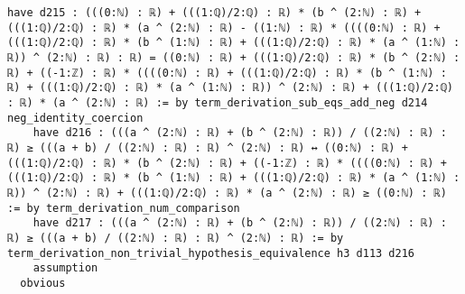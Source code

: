 \documentclass{article}
\begin{document}
\begin{tcolorbox}[colback=white!10, width=\linewidth]
\begin{lstlisting}[language=Lean4]
    have d215 : (((0:ℕ) : ℝ) + (((1:ℚ)/2:ℚ) : ℝ) * (b ^ (2:ℕ) : ℝ) + (((1:ℚ)/2:ℚ) : ℝ) * (a ^ (2:ℕ) : ℝ) - ((1:ℕ) : ℝ) * ((((0:ℕ) : ℝ) + (((1:ℚ)/2:ℚ) : ℝ) * (b ^ (1:ℕ) : ℝ) + (((1:ℚ)/2:ℚ) : ℝ) * (a ^ (1:ℕ) : ℝ)) ^ (2:ℕ) : ℝ) : ℝ) = ((0:ℕ) : ℝ) + (((1:ℚ)/2:ℚ) : ℝ) * (b ^ (2:ℕ) : ℝ) + ((-1:ℤ) : ℝ) * ((((0:ℕ) : ℝ) + (((1:ℚ)/2:ℚ) : ℝ) * (b ^ (1:ℕ) : ℝ) + (((1:ℚ)/2:ℚ) : ℝ) * (a ^ (1:ℕ) : ℝ)) ^ (2:ℕ) : ℝ) + (((1:ℚ)/2:ℚ) : ℝ) * (a ^ (2:ℕ) : ℝ) := by term_derivation_sub_eqs_add_neg d214 neg_identity_coercion
    have d216 : (((a ^ (2:ℕ) : ℝ) + (b ^ (2:ℕ) : ℝ)) / ((2:ℕ) : ℝ) : ℝ) ≥ (((a + b) / ((2:ℕ) : ℝ) : ℝ) ^ (2:ℕ) : ℝ) ↔ ((0:ℕ) : ℝ) + (((1:ℚ)/2:ℚ) : ℝ) * (b ^ (2:ℕ) : ℝ) + ((-1:ℤ) : ℝ) * ((((0:ℕ) : ℝ) + (((1:ℚ)/2:ℚ) : ℝ) * (b ^ (1:ℕ) : ℝ) + (((1:ℚ)/2:ℚ) : ℝ) * (a ^ (1:ℕ) : ℝ)) ^ (2:ℕ) : ℝ) + (((1:ℚ)/2:ℚ) : ℝ) * (a ^ (2:ℕ) : ℝ) ≥ ((0:ℕ) : ℝ) := by term_derivation_num_comparison
    have d217 : (((a ^ (2:ℕ) : ℝ) + (b ^ (2:ℕ) : ℝ)) / ((2:ℕ) : ℝ) : ℝ) ≥ (((a + b) / ((2:ℕ) : ℝ) : ℝ) ^ (2:ℕ) : ℝ) := by term_derivation_non_trivial_hypothesis_equivalence h3 d113 d216
    assumption
  obvious

\end{lstlisting}
\end{tcolorbox}
\end{document}

